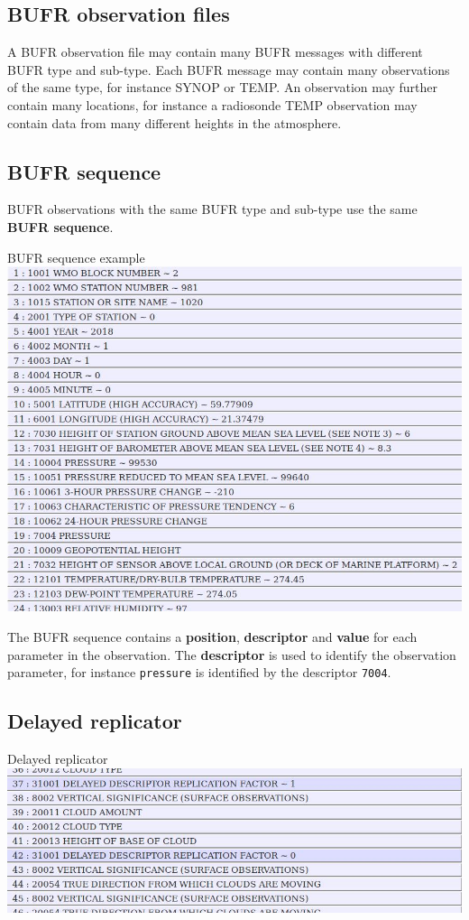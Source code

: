 \documentclass[letterpaper,10pt,twoside,twocolumn,openany]{book}
\begin{document}
{\hypertarget{bufr}{}
\subsection{BUFR observation files}
A BUFR observation file may contain many BUFR messages with different BUFR type and sub-type.
Each BUFR message may contain many observations of the same type, for instance SYNOP or TEMP. 
An observation may further contain many locations, for instance a radiosonde TEMP 
observation may contain data from many different heights in the atmosphere.


\hypertarget{sequence}{}
\subsection{BUFR sequence}
BUFR observations with the same BUFR type and sub-type use the same {\bf BUFR sequence}.
\begin{paperbox}{BUFR sequence example}
  \includegraphics[width=\columnwidth]{bufr1.jpg}
\end{paperbox}
The BUFR sequence contains a {\bf position}, {\bf descriptor} and {\bf value}
for each parameter in the observation.
The {\bf descriptor} is used to identify the observation parameter, for instance 
\lstinline!pressure! is identified by the descriptor \lstinline!7004!.
\hypertarget{delayed}{}
\subsection{Delayed replicator}
\begin{paperbox}{Delayed replicator}
  \includegraphics[width=\columnwidth]{bufr2.jpg}
\end{paperbox}

}
\end{document}
